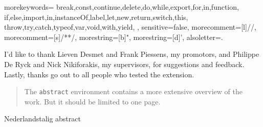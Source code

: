 \documentclass[master=cws,english]{kulemt}
\begin{document}
 {
    morekeywords={
        break,const,continue,delete,do,while,export,for,in,function,
        if,else,import,in,instanceOf,label,let,new,return,switch,this,
        throw,try,catch,typeof,var,void,with,yield,
        },
    sensitive=false,
    morecomment=[l]{//},
    morecomment=[s]{/*}{*/},
    morestring=[b]",
    morestring=[d]',
    alsoletter={.}
}


\begin{preface}
I'd like to thank Lieven Desmet and Frank Piessens, my promotors, and Philippe De Ryck and Nick Nikiforakis, my supervisors, for suggestions and feedback. Lastly, thanks go out to all people who tested the extension.
\end{preface}

\tableofcontents*

\begin{abstract}
The \texttt{abstract} environment contains a more extensive overview of
the work. But it should be limited to one page.
\end{abstract}

\begin{abstract*}
Nederlandstalig abstract
\end{abstract*}

\listoffiguresandtables

\printglossaries

\mainmatter







\backmatter

\end{document}
